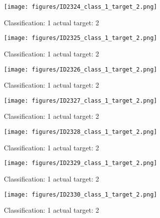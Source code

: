 \begin{figure}[h!]
\begin{center}
\texttt{[image: figures/ID2324\_class\_1\_target\_2.png]}
\end{center}
\caption{ Classification: 1 actual target: 2}
\label{fig:ID2324_class_1_target_2}
\end{figure}
\begin{figure}[h!]
\begin{center}
\texttt{[image: figures/ID2325\_class\_1\_target\_2.png]}
\end{center}
\caption{ Classification: 1 actual target: 2}
\label{fig:ID2325_class_1_target_2}
\end{figure}
\begin{figure}[h!]
\begin{center}
\texttt{[image: figures/ID2326\_class\_1\_target\_2.png]}
\end{center}
\caption{ Classification: 1 actual target: 2}
\label{fig:ID2326_class_1_target_2}
\end{figure}
\begin{figure}[h!]
\begin{center}
\texttt{[image: figures/ID2327\_class\_1\_target\_2.png]}
\end{center}
\caption{ Classification: 1 actual target: 2}
\label{fig:ID2327_class_1_target_2}
\end{figure}
\begin{figure}[h!]
\begin{center}
\texttt{[image: figures/ID2328\_class\_1\_target\_2.png]}
\end{center}
\caption{ Classification: 1 actual target: 2}
\label{fig:ID2328_class_1_target_2}
\end{figure}
\begin{figure}[h!]
\begin{center}
\texttt{[image: figures/ID2329\_class\_1\_target\_2.png]}
\end{center}
\caption{ Classification: 1 actual target: 2}
\label{fig:ID2329_class_1_target_2}
\end{figure}
\begin{figure}[h!]
\begin{center}
\texttt{[image: figures/ID2330\_class\_1\_target\_2.png]}
\end{center}
\caption{ Classification: 1 actual target: 2}
\label{fig:ID2330_class_1_target_2}
\end{figure}
